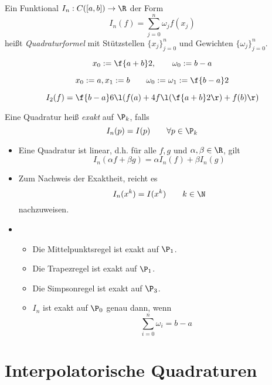 \documentclass[11pt]{scrbook}
\begin{document}
\begin{df}[Quadratur]
	\label{2.1}
	Ein Funktional $I_n : C([a,b]) \to \R$ der Form
	\[
		I_n(f) = \sum_{j=0}^n \omega_j f(x_j)
	\]
	heißt \emph{Quadraturformel} mit Stützstellen $\{x_j\}_{j=0}^n$ und Gewichten $\{\omega_j\}_{j=0}^n$.
\end{df}

\begin{ex*}
	\begin{seg}[Mittelpunktsregel ($n=0$)]
		\[
			x_0 := \f {a+b}2, \qquad \omega_0 := b-a
		\]				
	\end{seg}
	\begin{seg}[Trapezregel ($n=1$)]
		\[
			x_0 := a, x_1 := b \qquad \omega_0 := \omega_1 := \f {b-a}2
		\]				
	\end{seg}
	\begin{seg}[Simpsonregel ($n=2$)]
		\[
			I_2(f) = \f {b-a}6 \l( f(a) + 4f\l(\f {a+b}2\r) + f(b) \r)
		\]
	\end{seg}
\end{ex*}

\begin{df}[Exaktheit]
	\label{2.2}
	Eine Quadratur heiß \emph{exakt} auf $\P_k$, falls
	\[
		I_n(p) = I(p) \qquad \forall p\in \P_k
	\]
\end{df}

\begin{nt*}
	\begin{itemize}
		\item
			Eine Quadratur ist linear, d.h. für alle $f,g$ und $\alpha,\beta \in \R$, gilt
			\[
				I_n ( \alpha f + \beta g) = \alpha I_n(f) + \beta I_n(g)
			\]
		\item
			Zum Nachweis der Exaktheit, reicht es
			\[
				I_n(x^k) = I(x^k) \qquad k\in \N
			\]
			nachzuweisen.
		\item
			\begin{itemize}
				\item
					Die Mittelpunktsregel ist exakt auf $\P_1$.
				\item
					Die Trapezregel ist exakt auf $\P_1$.
				\item
					Die Simpsonregel ist exakt auf $\P_3$.
				\item
					$I_n$ ist exakt auf $\P_0$ genau dann, wenn
					\[
						\sum_{i=0}^n \omega_i = b-a
					\]
			\end{itemize}
	\end{itemize}
\end{nt*}


\section{Interpolatorische Quadraturen}
\end{document}
